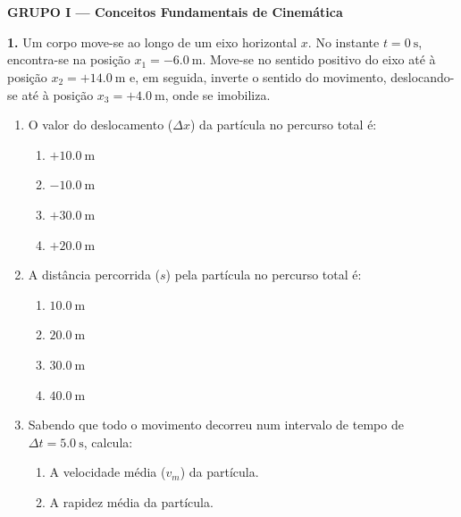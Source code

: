 \documentclass[11pt, a4paper]{article}
\begin{document}
\vspace{0.4cm}

\section*{}
\begin{center}
  \colorbox{primaryNavy}{\parbox{0.97\textwidth}{\color{white}\bfseries\large GRUPO I --- Conceitos Fundamentais de Cinemática}}
\end{center}

\textbf{1.} Um corpo move-se ao longo de um eixo horizontal $x$. No instante $t = \SI{0}{\second}$, encontra-se na posição $x_1 = \SI{-6,0}{\meter}$. Move-se no sentido positivo do eixo até à posição $x_2 = +\SI{14,0}{\meter}$ e, em seguida, inverte o sentido do movimento, deslocando-se até à posição $x_3 = +\SI{4,0}{\meter}$, onde se imobiliza.

\begin{enumerate}[label=\textbf{1.\arabic*}]
  \item O valor do deslocamento ($\Delta x$) da partícula no percurso total é:
  \begin{enumerate}[label=(\textnormal{\Alph*})]
    \item $+\SI{10,0}{\meter}$
    \item $\SI{-10,0}{\meter}$
    \item $+\SI{30,0}{\meter}$
    \item $+\SI{20,0}{\meter}$
  \end{enumerate}

  \item A distância percorrida ($s$) pela partícula no percurso total é:
  \begin{enumerate}[label=(\textnormal{\Alph*})]
    \item $\SI{10,0}{\meter}$
    \item $\SI{20,0}{\meter}$
    \item $\SI{30,0}{\meter}$
    \item $\SI{40,0}{\meter}$
  \end{enumerate}

  \item Sabendo que todo o movimento decorreu num intervalo de tempo de $\Delta t = \SI{5,0}{\second}$, calcula:
  \begin{enumerate}[label=\alph*)]
    \item A velocidade média ($v_m$) da partícula.
    \item A rapidez média da partícula.
  \end{enumerate}
\end{enumerate}
\end{document}
